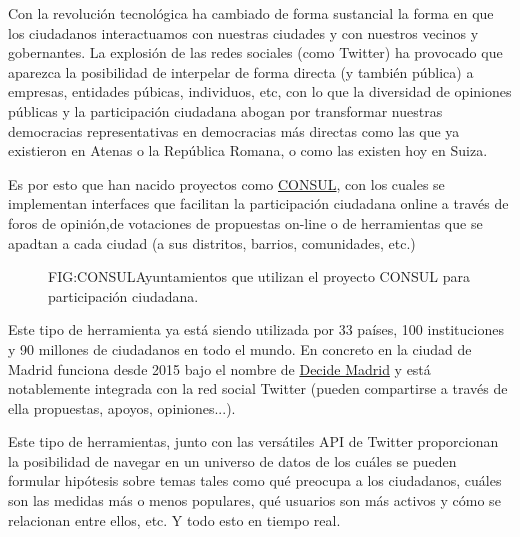 Con la revolución tecnológica ha cambiado de forma sustancial la forma en que los ciudadanos interactuamos con nuestras ciudades y con nuestros vecinos y gobernantes. La explosión de las redes sociales (como Twitter) ha provocado que aparezca la posibilidad de interpelar de forma directa (y también pública) a empresas, entidades púbicas, individuos, etc, con lo que la diversidad de opiniones públicas y la participación ciudadana abogan por transformar nuestras democracias representativas en democracias más directas como las que ya existieron en Atenas o la República Romana, o como las existen hoy en Suiza.

Es por esto que han nacido proyectos como \href{http://consulproject.org/en/}{CONSUL}, con los cuales se implementan interfaces que facilitan la participación ciudadana online a través de foros de opinión,de votaciones de propuestas on-line o de herramientas que se apadtan a cada ciudad (a sus distritos, barrios, comunidades, etc.) 

\begin{figure}[Consul en España y el mundo]{FIG:CONSUL}{Ayuntamientos que utilizan el proyecto CONSUL para participación ciudadana.}
	 \quad
\end{figure}

Este tipo de herramienta ya está siendo utilizada por 33 países, 100 instituciones y 90 millones de ciudadanos en todo el mundo. En concreto en la ciudad de Madrid funciona desde 2015 bajo el nombre de \href{https://decide.madrid.es/}{Decide Madrid} y está notablemente integrada con la red social Twitter (pueden compartirse  a través de ella propuestas, apoyos, opiniones...).

Este tipo de herramientas, junto con las versátiles API de Twitter proporcionan la posibilidad de navegar en un universo de datos de los cuáles se pueden formular hipótesis sobre temas tales como qué preocupa a los ciudadanos, cuáles son las medidas más o menos populares, qué usuarios son más activos y cómo se relacionan entre ellos, etc. Y todo esto en tiempo real.

